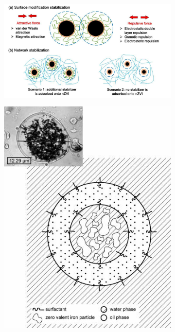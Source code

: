 \begin{figure}[h]
    \centering
    \begin{subfigure}{.4\textwidth}
		\includegraphics[width=\textwidth]{figs/fig1.png}
	\end{subfigure}
	\begin{subfigure}{.4\textwidth}
		\includegraphics[width=\textwidth]{figs/fig2.png}
	\end{subfigure}
    \label{fig1}
\end{figure}

